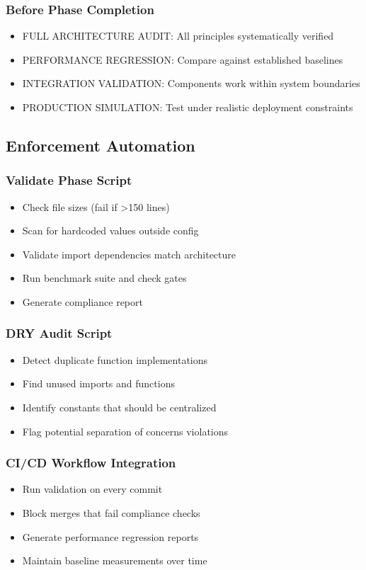 \documentclass{article}
\begin{document}
\subsubsection{Before Phase Completion}
\begin{itemize}[noitemsep]
\item FULL ARCHITECTURE AUDIT: All principles systematically verified
\item PERFORMANCE REGRESSION: Compare against established baselines
\item INTEGRATION VALIDATION: Components work within system boundaries
\item PRODUCTION SIMULATION: Test under realistic deployment constraints
\end{itemize}

\subsection{Enforcement Automation}

\subsubsection{Validate Phase Script}
\begin{itemize}[noitemsep]
\item Check file sizes (fail if >150 lines)
\item Scan for hardcoded values outside config
\item Validate import dependencies match architecture
\item Run benchmark suite and check gates
\item Generate compliance report
\end{itemize}

\subsubsection{DRY Audit Script}
\begin{itemize}[noitemsep]
\item Detect duplicate function implementations
\item Find unused imports and functions
\item Identify constants that should be centralized
\item Flag potential separation of concerns violations
\end{itemize}

\subsubsection{CI/CD Workflow Integration}
\begin{itemize}[noitemsep]
\item Run validation on every commit
\item Block merges that fail compliance checks
\item Generate performance regression reports
\item Maintain baseline measurements over time
\end{itemize}
\end{document}
